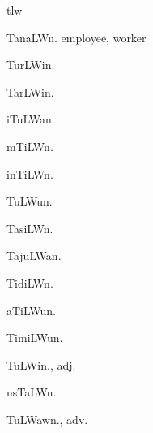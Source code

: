 \begin{multicols*}{2}
\begin{dictroot}{t}{lw}
\begin{dictentry}{TanaLW}{n.}
{            employee, worker
        }
    \end{dictentry}
    \begin{dictentry}{TurLWi}{n.}
    \end{dictentry}
    \begin{dictentry}{TarLWi}{n.}
    \end{dictentry}
    \begin{dictentry}{iTuLWa}{n.}
    \end{dictentry}
    \begin{dictentry}{mTiLW}{n.}
    \end{dictentry}
    \begin{dictentry}{inTiLW}{n.}
    \end{dictentry}
    \begin{dictentry}{TuLWu}{n.}
    \end{dictentry}
    \begin{dictentry}{TasiLW}{n.}
    \end{dictentry}
    \begin{dictentry}{TajuLWa}{n.}
    \end{dictentry}
    \begin{dictentry}{TidiLW}{n.}
    \end{dictentry}
    \begin{dictentry}{aTiLWu}{n.}
    \end{dictentry}
    \begin{dictentry}{TimiLWu}{n.}
    \end{dictentry}
    \begin{dictentry}{TuLWi}{n., adj.}
    \end{dictentry}
    \begin{dictentry}{usTaLW}{n.}
    \end{dictentry}
    \begin{dictentry}{TuLWaw}{n., adv.}
    \end{dictentry}
\end{dictroot}


\end{multicols*}

